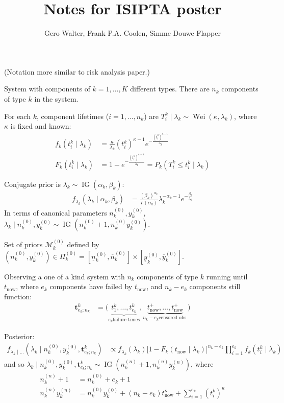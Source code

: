 \documentclass[12pt,a4paper,fleqn]{narms}
\title{Notes for ISIPTA poster}
\author{Gero Walter, Frank P.A. Coolen, Simme Douwe Flapper}
\newcommand{\mbf}[1]{\mathbf{#1}}
\newcommand{\uz}{^{(0)}} %
\newcommand{\un}{^{(n)}} %
\newcommand{\ul}[1]{\underline{#1}}
\newcommand{\ol}[1]{\overline{#1}}
\newcommand{\wei}{\operatorname{Wei}} %
\newcommand{\ig}{\operatorname{IG}}   %
\def\ykz{y\uz_k}
\def\ykn{y\un_k}
\def\ykzl{\ul{y}\uz_k}
\def\ykzu{\ol{y}\uz_k}
\def\nkz{n\uz_k}
\def\nkn{n\un_k}
\def\nkzl{\ul{n}\uz_k}
\def\nkzu{\ol{n}\uz_k}
\def\MkZ{\mathcal{M}\uz_k}
\def\PkZ{\Pi\uz_k}
\def\tnow{t_\text{now}}
\def\tpnow{t^+_\text{now}}
\begin{document}
\maketitle

(Notation more similar to risk analysis paper.)

System with components of $k=1,\ldots,K$ different types.
There are $n_k$ components of type $k$ in the system.

For each $k$, component lifetimes ($i=1,\ldots,n_k$) are $T_i^k \mid \lambda_k \sim \wei(\kappa,\lambda_k)$,
where $\kappa$ is fixed and known:
\begin{align}
f_k(t_i^k \mid \lambda_k) &= \frac{\kappa}{\lambda_k} (t_i^k)^{\kappa-1} e^{-\frac{(t_i^k)^{\kappa-1}}{\lambda_k}} \\
F_k(t_i^k \mid \lambda_k) &= 1 - e^{-\frac{(t_i^k)^{\kappa-1}}{\lambda_k}} = P_k(T_i^k \leq t_i^k \mid \lambda_k)
\end{align}

Conjugate prior is $\lambda_k \sim \ig(\alpha_k,\beta_k)$:
\begin{align}
f_{\lambda_k}(\lambda_k\mid \alpha_k,\beta_k) &= \frac{(\beta_k)^{\alpha_k}}{\Gamma(\alpha_k)} \lambda_k^{-\alpha_k -1} e^{-\frac{\beta_k}{\lambda_k}}
\end{align}
In terms of canonical parameters $\nkz,\ykz$, $\lambda_k \mid \nkz,\ykz \sim \ig(\nkz + 1, \nkz\ykz)$.

Set of priors $\MkZ$ defined by $(\nkz,\ykz) \in \PkZ = [\nkzl,\nkzu] \times [\ykzl,\ykzu]$.

Observing a one of a kind system with $n_k$ components of type $k$ running until $\tnow$,
where $e_k$ components have failed by $\tnow$, and $n_k - e_k$ components still function:
\begin{align}
\mbf{t}^k_{e_k;n_k} &= \big( \underbrace{t^k_1, \ldots, t^k_{e_k}}_{e_k \text{failure times}},
                             \underbrace{\tpnow, \ldots, \tpnow}_{n_k-e_k \text{censored obs.}} \big)
\end{align}

Posterior:
\begin{align}
f_{\lambda_k\mid\ldots}(\lambda_k\mid\nkz,\ykz,\mbf{t}^k_{e_k;n_k})
 &\propto f_{\lambda_k}(\lambda_k)
          \big[ 1- F_k(\tnow\mid\lambda_k) \big]^{n_k-e_k}
          \prod_{i=1}^{e_k} f_k(t_i^k \mid \lambda_k) 
\end{align}
and so $\lambda_k\mid\nkz,\ykz,\mbf{t}^k_{e_k;n_k} \sim \ig(\nkn + 1, \nkn\ykn)$, where
\begin{align}
\nkn + 1 &= \nkz + e_k + 1 \\
\nkn\ykn &= \nkz\ykz + (n_k-e_k) \tnow^\kappa + \sum_{i=1}^{e_k} (t_i^k)^\kappa
\end{align}
\end{document}
